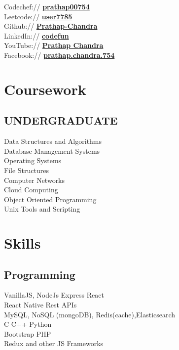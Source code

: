 \documentclass[]{deedy-resume-openfont}
\begin{document}
\begin{minipage}[t]{0.33\textwidth}
Codechef://  \href{https://www.codechef.com/users/prathap00754}{\bf prathap00754} \\
Leetcode://  \href{https://leetcode.com/user7785/}{\bf user7785} \\
Github:// \href{https://github.com/Prathap-Chandra}{\bf Prathap-Chandra} \\
LinkedIn://  \href{https://www.linkedin.com/in/codefun/}{\bf codefun} \\
YouTube://  \href{https://www.youtube.com/channel/UChfA9tIKEAduV_kxuHyAIkA}{\bf Prathap Chandra} \\
Facebook:// \href{https://facebook.com/prathap.chandra.754}{\bf prathap.chandra.754} \\


\section{Coursework}
\subsection{UNDERGRADUATE}
Data Structures and Algorithms\\
Database Management Systems\\
Operating Systems\\
File Structures\\
Computer Networks\\
Cloud Computing\\
Object Oriented Programming\\
Unix Tools and Scripting\\
\sectionsep


\section{Skills}
\subsection{Programming}
VanillaJS, NodeJs \textbullet{} Express \textbullet{} 
React \\ \textbullet{} React Native \textbullet{} Rest APIs\\
\textbullet{} MySQL, NoSQL (mongoDB),
Redis(cache),Elasticsearch\\ 
\textbullet{} C \textbullet{} C++ \textbullet{} Python\\
\textbullet{} Bootstrap \textbullet{} PHP\\
\textbullet{} Redux and other JS Frameworks
\sectionsep

%
%

\end{minipage} 
\end{document}
